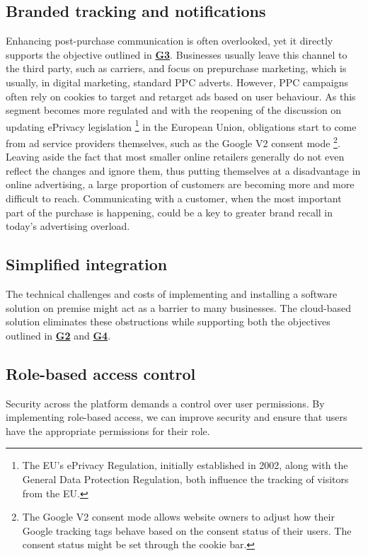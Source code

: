 \subsection{Branded tracking and notifications}
Enhancing post-purchase communication is often overlooked, yet it directly supports the objective outlined in \hyperref[subsec:project-goals]{\textbf{G3}}.
Businesses usually leave this channel to the third party, such as carriers, and focus on prepurchase marketing, which is usually, in digital marketing, standard \ac{PPC} adverts. 
However, \ac{PPC} campaigns often rely on cookies to target and retarget ads based on user behaviour.
As this segment becomes more regulated and with the reopening of the discussion on updating ePrivacy legislation \footnote{The EU's ePrivacy Regulation, initially established in 2002, along with the General Data Protection Regulation, both influence the tracking of visitors from the EU.} in the European Union, obligations start to come from ad service providers themselves, such as the Google V2 consent mode \footnote{The Google V2 consent mode allows website owners to adjust how their Google tracking tags behave based on the consent status of their users. The consent status might be set through the cookie bar.}. 
Leaving aside the fact that most smaller online retailers generally do not even reflect the changes and ignore them, thus putting themselves at a disadvantage in online advertising, a large proportion of customers are becoming more and more difficult to reach.
Communicating with a customer, when the most important part of the purchase is happening, could be a key to greater brand recall in today's advertising overload. 

\subsection{Simplified integration}
The technical challenges and costs of implementing and installing a software solution on premise might act as a barrier to many businesses. 
The cloud-based solution eliminates these obstructions while supporting both the objectives outlined in \hyperref[subsec:project-goals]{\textbf{G2}} and \hyperref[subsec:project-goals]{\textbf{G4}}.

\subsection{Role-based access control}
Security across the platform demands a control over user permissions.
By implementing role-based access, we can improve security and ensure that users have the appropriate permissions for their role.

